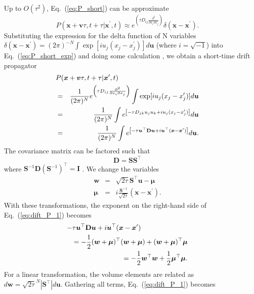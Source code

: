 \documentclass[aps,pre,reprint,superscriptaddress,showpacs,amsmath
,floatfix
]{revtex4-2}
\renewcommand{\vec}[1]{\boldsymbol{#1}}
\newcommand{\mat}[1]{\textbf{#1}}
\newcommand{\eq}[1]{Eq.~(\ref{#1})}
\newcommand{\Order}[1]{O(#1)}
\begin{document}
Up to $\Order{\tau^2}$, \eq{eq:P_short} can be approximate
\begin{equation}
\label{eq:P_short_exp}
P(\vec{x}+\vec{v}\tau,t+\tau|\vec{x}^\prime,t) \approx  e^{ \left( \tau D_{ij} \frac{\partial^2 }{\partial x_i\partial x_j}  \right) } \delta(\vec{x}-\vec{x}^\prime).
\end{equation}
Substituting the expression for the delta function of N variables $\delta(\vec{x}-\vec{x}^\prime) = (2\pi)^{-N}\int\exp[iu_j(x_j-x_j^\prime)]d\vec{u}$ (where $i=\sqrt{-1}$) into \eq{eq:P_short_exp} and doing some calculation \cite{risken1996fokker}, we obtain a short-time drift propagator
\begin{eqnarray}
\label{eq:dift_P_1}
\lefteqn{
P(\vec{x}+\vec{v}\tau,t+\tau|\vec{x}^\prime,t) } \nonumber\\
&=& \frac{1}{(2\pi)^N} e^{ \left( \tau D_{ij} \frac{\partial^2 }{\partial x_i\partial x_j} \right) } \int\exp[iu_j(x_j-x_j^\prime)] d\vec{u} \nonumber\\
&=& \frac{1}{(2\pi)^N} \int e^{ \left[ -\tau D_{jk} u_j u_k +  iu_j(x_j-x_j^\prime)  \right] } d\vec{u} \nonumber\\
&=& \frac{1}{(2\pi)^N} \int e^{ \left[ -\tau \vec{u}^\top \mat{D} \vec{u} +  i\vec{u}^\top (\vec{x} - \vec{x}^\prime)  \right] } d\vec{u}.
\end{eqnarray}
The covariance matrix can be factored such that 
\begin{equation}
    \mat{D} = \mat{S}\mat{S}^\top 
\end{equation}
where $\mat{S}^{-1}\mat{D}(\mat{S}^{-1})^\top = \mat{I}$ \cite{stark1986probability}. We change the variables 
\begin{eqnarray}
    \vec{w} &=& \sqrt{2\tau} \mat{S}^\top\vec{u} - \vec{\mu} \\
    \vec{\mu} &=& i\frac{\mat{S}^{-1}}{\sqrt{2\tau}} (\vec{x} - \vec{x}^\prime).
\end{eqnarray}
With these transformations, the exponent on the right-hand side of \eq{eq:dift_P_1} becomes 
\begin{eqnarray}
\lefteqn{
    -\tau \vec{u}^\top \mat{D} \vec{u} +  i\vec{u}^\top (\vec{x} - \vec{x}^\prime)
} \nonumber \\
    && = -\frac{1}{2} (\vec{w}+\vec{\mu})^\top (\vec{w}+\vec{\mu}) + (\vec{w}+\vec{\mu})^\top \vec{\mu} \nonumber \\
    && = -\frac{1}{2} \vec{w}^\top \vec{w} + \frac{1}{2} \vec{\mu}^\top \vec{\mu}.
\end{eqnarray}
For a linear transformation, the volume elements are related as $d\vec{w} = \sqrt{2\tau}^N |\mat{S}^\top| d\vec{u}$. Gathering all terms, \eq{eq:dift_P_1} becomes
\end{document}
